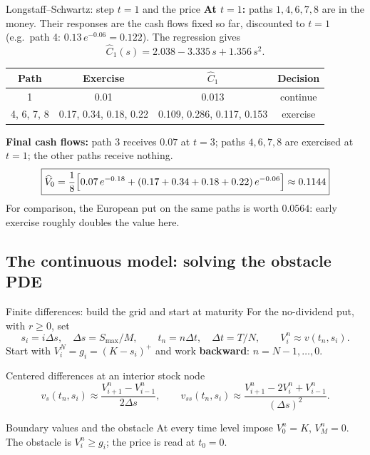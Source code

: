 \documentclass[handout,10pt,aspectratio=169]{beamer}
\begin{document}
\begin{frame}{Longstaff--Schwartz: step \(t=1\) and the price}
\small
\textbf{At \(t=1\):} paths \(1,4,6,7,8\) are in the money. Their responses are
the cash flows fixed so far, discounted to \(t=1\) (e.g.\ path 4:
\(0.13\,e^{-0.06}=0.122\)). The regression gives
\[
\widehat C_1(s)=2.038-3.335\,s+1.356\,s^2 .
\]
\begin{center}
\begin{tabular}{c|ccc}
\toprule
Path & Exercise & \(\widehat C_1\) & Decision\\
\midrule
1 & 0.01 & 0.013 & continue\\
4, 6, 7, 8 & 0.17, 0.34, 0.18, 0.22 & 0.109, 0.286, 0.117, 0.153 & exercise\\
\bottomrule
\end{tabular}
\end{center}
\textbf{Final cash flows:} path 3 receives \(0.07\) at \(t=3\); paths
\(4,6,7,8\) are exercised at \(t=1\); the other paths receive nothing.
\[
\boxed{\widehat V_0=\frac18\Bigl[0.07\,e^{-0.18}
+(0.17+0.34+0.18+0.22)\,e^{-0.06}\Bigr]\approx0.1144}
\]
For comparison, the European put on the same paths is worth \(0.0564\):
early exercise roughly doubles the value here.
\end{frame}

\subsection{The continuous model: solving the obstacle PDE}

\begin{frame}{Finite differences: build the grid and start at maturity}
For the no-dividend put, with \(r\geq0\), set
\[
s_i=i\Delta s,\quad \Delta s=S_{\max}/M,\qquad
t_n=n\Delta t,\quad \Delta t=T/N,\qquad V_i^n\approx v(t_n,s_i).
\]
Start with \(V_i^N=g_i=(K-s_i)^+\) and work
\textbf{backward}: \(n=N-1,\ldots,0\).
\begin{block}{Centered differences at an interior stock node}
\[
v_s(t_n,s_i)\approx\frac{V_{i+1}^n-V_{i-1}^n}{2\Delta s},\qquad
v_{ss}(t_n,s_i)\approx
\frac{V_{i+1}^n-2V_i^n+V_{i-1}^n}{(\Delta s)^2}.
\]
\end{block}
\begin{block}{Boundary values and the obstacle}
At every time level impose \(V_0^n=K\), \(V_M^n=0\).
The obstacle is \(V_i^n\geq g_i\); the price is read at \(t_0=0\).
\end{block}
\end{frame}
\end{document}
